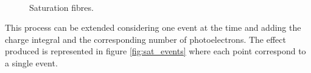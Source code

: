 \begin{figure}
	\centering
	 \\
	\caption{Saturation fibres.}
	\label{fig:sat_fibres}
\end{figure}

This process can be extended considering one event at the time and adding the charge integral and the corresponding number of photoelectrons. The effect produced is represented in figure \ref{fig:sat_events} where each point correspond to a single event.\\

